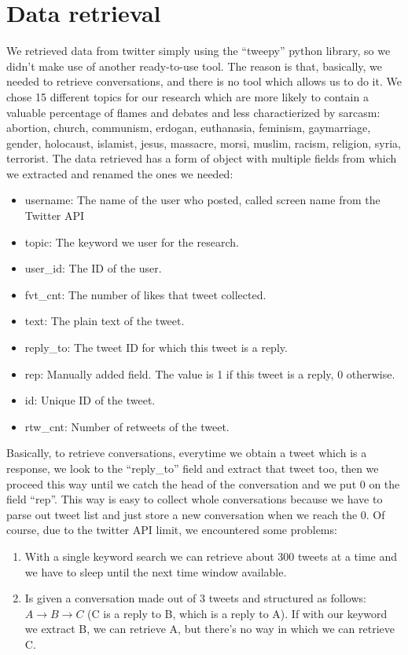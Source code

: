 \documentclass[a4paper,10pt, english]{report}
\begin{document}
\section{Data retrieval}
We retrieved data from twitter simply using the ``tweepy'' python library, so we didn't make use of another ready-to-use tool.
The reason is that, basically, we needed to retrieve conversations, and there is no tool which allows us to do it.
\newline
We chose 15 different topics for our research which are more likely to contain a valuable percentage of flames and debates and less charactierized by sarcasm:
abortion, church, communism, erdogan, euthanasia, feminism,
gaymarriage, gender, holocaust, islamist, jesus, massacre, morsi,
muslim, racism, religion, syria, terrorist.
\newline
The data retrieved has a form of object with multiple fields from which we extracted and renamed the ones we needed:
\begin{itemize}
 \item username: The name of the user who posted, called screen name from the Twitter API
 \item topic: The keyword we user for the research.
 \item user\_id: The ID of the user.
 \item fvt\_cnt: The number of likes that tweet collected.
 \item text: The plain text of the tweet.
 \item reply\_to: The tweet ID for which this tweet is a reply.
 \item rep: Manually added field. The value is 1 if this tweet is a reply, 0 otherwise.
 \item id: Unique ID of the tweet.
 \item rtw\_cnt: Number of retweets of the tweet. 
\end{itemize}
Basically, to retrieve conversations, everytime we obtain a tweet which is a response, we look to the ``reply\_to'' field and extract that tweet too, then we proceed this way until we catch the head of the conversation and we put 0 on the field ``rep''.
This way is easy to collect whole conversations because we have to parse out tweet list and just store a new conversation when we reach the 0.
Of course, due to the twitter API limit, we encountered some problems:
\begin{enumerate}
 \item With a single keyword search we can retrieve about 300 tweets at a time and we have to sleep until the next time window available.
 \item Is given a conversation made out of 3 tweets and structured as follows: $A \to B \to C$ (C is a reply to B, which is a reply to A). If with our keyword we extract B, we can retrieve A, but there's no way in which we can retrieve C.
\end{enumerate}
\end{document}
